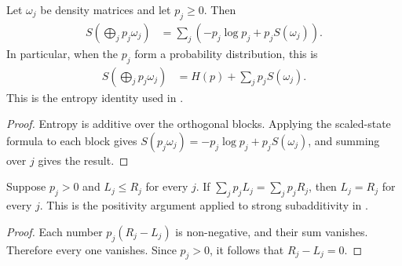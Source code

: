 \begin{theorem}
    \label{thm:entropy_weighted_block_diagonal}
    \leanok
    Let $\omega_j$ be density matrices and let $p_j\geq0$. Then
    \begin{align}
        S\!\left(\bigoplus_j p_j\omega_j\right)
        &=\sum_j(-p_j\log p_j+p_jS(\omega_j)).
        \label{eq:entropy_weighted_blocks}
    \end{align}
    In particular, when the $p_j$ form a probability distribution, this is
    \begin{align}
        S\!\left(\bigoplus_j p_j\omega_j\right)
        &=H(p)+\sum_j p_jS(\omega_j).
        \label{eq:entropy_weighted_probability}
    \end{align}
    This is the entropy identity used in
    \cite[Appendix~C.2, lines~1760--1770]{Cirac2016MPDO_arXiv}.
\end{theorem}

\begin{proof}\leanok
    Entropy is additive over the orthogonal blocks. Applying the scaled-state
    formula to each block gives
    $S(p_j\omega_j)=-p_j\log p_j+p_jS(\omega_j)$, and summing over $j$ gives
    the result.
\end{proof}

\begin{theorem}
    \label{thm:positive_weighted_sum_termwise_equality}
    \leanok
    Suppose $p_j>0$ and $L_j\leq R_j$ for every $j$. If
    $\sum_jp_jL_j=\sum_jp_jR_j$, then $L_j=R_j$ for every $j$. This is the
    positivity argument applied to strong subadditivity in
    \cite[Appendix~C.2, lines~1770--1780]{Cirac2016MPDO_arXiv}.
\end{theorem}

\begin{proof}\leanok
    Each number $p_j(R_j-L_j)$ is non-negative, and their sum vanishes.
    Therefore every one vanishes. Since $p_j>0$, it follows that
    $R_j-L_j=0$.
\end{proof}
